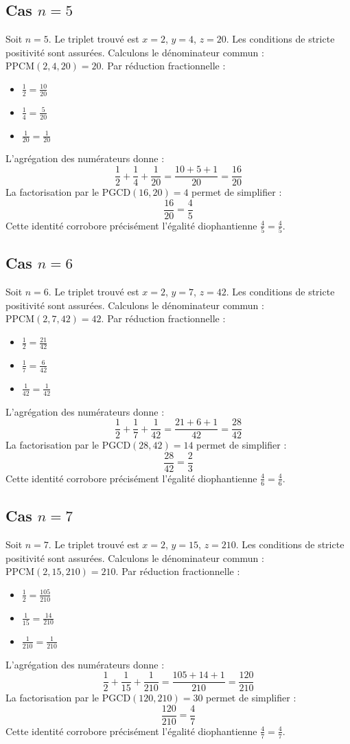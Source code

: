 \documentclass[11pt,a4paper]{article}
\begin{document}
\subsection{Cas $n = 5$}
Soit $n = 5$. Le triplet trouvé est $x = 2$, $y = 4$, $z = 20$.
Les conditions de stricte positivité sont assurées.
Calculons le dénominateur commun : $\text{PPCM}(2, 4, 20) = 20$.
Par réduction fractionnelle :
\begin{itemize}
    \item $\frac{1}{2} = \frac{10}{20}$
    \item $\frac{1}{4} = \frac{5}{20}$
    \item $\frac{1}{20} = \frac{1}{20}$
\end{itemize}
L'agrégation des numérateurs donne :
$$ \frac{1}{2} + \frac{1}{4} + \frac{1}{20} = \frac{10 + 5 + 1}{20} = \frac{16}{20} $$
La factorisation par le $\text{PGCD}(16, 20) = 4$ permet de simplifier :
$$ \frac{16}{20} = \frac{4}{5} $$
Cette identité corrobore précisément l'égalité diophantienne $\frac{4}{5} = \frac{4}{5}$.

\subsection{Cas $n = 6$}
Soit $n = 6$. Le triplet trouvé est $x = 2$, $y = 7$, $z = 42$.
Les conditions de stricte positivité sont assurées.
Calculons le dénominateur commun : $\text{PPCM}(2, 7, 42) = 42$.
Par réduction fractionnelle :
\begin{itemize}
    \item $\frac{1}{2} = \frac{21}{42}$
    \item $\frac{1}{7} = \frac{6}{42}$
    \item $\frac{1}{42} = \frac{1}{42}$
\end{itemize}
L'agrégation des numérateurs donne :
$$ \frac{1}{2} + \frac{1}{7} + \frac{1}{42} = \frac{21 + 6 + 1}{42} = \frac{28}{42} $$
La factorisation par le $\text{PGCD}(28, 42) = 14$ permet de simplifier :
$$ \frac{28}{42} = \frac{2}{3} $$
Cette identité corrobore précisément l'égalité diophantienne $\frac{4}{6} = \frac{4}{6}$.

\subsection{Cas $n = 7$}
Soit $n = 7$. Le triplet trouvé est $x = 2$, $y = 15$, $z = 210$.
Les conditions de stricte positivité sont assurées.
Calculons le dénominateur commun : $\text{PPCM}(2, 15, 210) = 210$.
Par réduction fractionnelle :
\begin{itemize}
    \item $\frac{1}{2} = \frac{105}{210}$
    \item $\frac{1}{15} = \frac{14}{210}$
    \item $\frac{1}{210} = \frac{1}{210}$
\end{itemize}
L'agrégation des numérateurs donne :
$$ \frac{1}{2} + \frac{1}{15} + \frac{1}{210} = \frac{105 + 14 + 1}{210} = \frac{120}{210} $$
La factorisation par le $\text{PGCD}(120, 210) = 30$ permet de simplifier :
$$ \frac{120}{210} = \frac{4}{7} $$
Cette identité corrobore précisément l'égalité diophantienne $\frac{4}{7} = \frac{4}{7}$.
\end{document}
